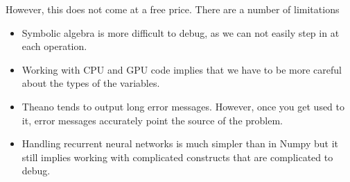 \noindent However, this does not come at a free price. There are a number of limitations

\begin{itemize}
\item Symbolic algebra is more difficult to debug, as we can not easily step in at each operation. 
\item Working with CPU and GPU code implies that we have to be more careful about the types of the variables.
\item Theano tends to output long error messages. However, once you get used to it, error messages accurately point the source of the problem. 
\item Handling recurrent neural networks is much simpler than in Numpy but it still implies working with complicated constructs that are complicated to debug. 
\end{itemize}

